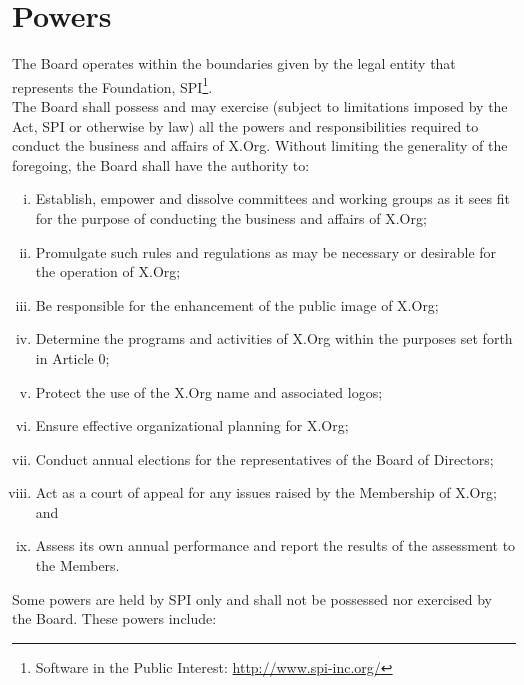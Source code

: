 \documentclass[10pt, english]{xorgdocs}
\begin{document}

\section{Powers}
The Board operates within the boundaries given by the legal entity that
represents the Foundation, SPI\footnote{Software
in the Public Interest: \url{http://www.spi-inc.org/}}.\\

The Board shall possess and may exercise (subject to limitations imposed by the
Act, SPI or otherwise by law) all the powers and responsibilities required to
conduct the business and affairs of X.Org. Without limiting the generality of
the foregoing, the Board shall have the authority to:

\begin{enumerate}[(i)\hspace{.2cm}]
	\item Establish, empower and dissolve committees and working groups as
	it sees fit for the purpose of conducting the business and affairs of
	X.Org;

	\item Promulgate such rules and regulations as may be necessary or
	desirable for the operation of X.Org;

	\item Be responsible for the enhancement of the public image of X.Org;

	\item Determine the programs and activities of X.Org within the purposes
	set forth in Article 0;

	\item Protect the use of the X.Org name and associated logos;

	\item Ensure effective organizational planning for X.Org;

	\item Conduct annual elections for the representatives of the Board of
	Directors;

	\item Act as a court of appeal for any issues raised by the Membership
	of X.Org; and

	\item Assess its own annual performance and report the results of the
	assessment to the Members.
\end{enumerate}

Some powers are held by SPI only and shall not be possessed nor exercised by
the Board. These powers include:
\end{document}
